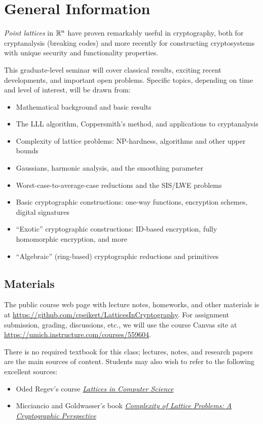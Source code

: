 \documentclass[11pt]{article}
\begin{document}
\thispagestyle{fancy}           %

\section{General Information}
\label{sec:general-information}

\emph{Point lattices} in $\mathbb{R}^{n}$ have proven remarkably useful in
cryptography, both for cryptanalysis (breaking codes) and more
recently for constructing cryptosystems with unique security and
functionality properties.

This graduate-level seminar will cover classical results, exciting
recent developments, and important open problems.  Specific topics,
depending on time and level of interest, will be drawn from:
\begin{itemize}[itemsep=0pt]
\item Mathematical background and basic results
\item The LLL algorithm, Coppersmith's method, and applications to
  cryptanalysis
\item Complexity of lattice problems: NP-hardness, algorithms and
  other upper bounds
\item Gaussians, harmonic analysis, and the smoothing parameter
\item Worst-case-to-average-case reductions and the SIS/LWE problems
\item Basic cryptographic constructions: one-way functions, encryption
  schemes, digital signatures
\item ``Exotic'' cryptographic constructions: ID-based encryption,
  fully homomorphic encryption, and more
\item ``Algebraic'' (ring-based) cryptographic reductions and
  primitives
\end{itemize}

\subsection{Materials}
\label{sec:materials}

The public course web page with lecture notes, homeworks, and other
materials is at {\small
  \url{https://github.com/cpeikert/LatticesInCryptography}}. For
assignment submission, grading, discussions, etc., we will use the
course Canvas site at
\url{https://umich.instructure.com/courses/559604}.

There is no required textbook for this class; lectures, notes, and
research papers are the main sources of content. Students may also
wish to refer to the following excellent sources:
\begin{itemize}
\item Oded Regev's course
  \href{http://www.cims.nyu.edu/~regev/teaching/lattices_fall_2009/index.html}{\emph{Lattices
      in Computer Science}}
\item Micciancio and Goldwasser's book
  \href{http://link.springer.com/book/10.1007/978-1-4615-0897-7/page/1}{\emph{Complexity
      of Lattice Problems: A Cryptographic Perspective}}
\end{itemize}
\end{document}

